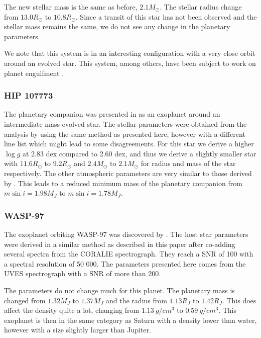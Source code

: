 \documentclass{aa}
\begin{document}
The new stellar mass is the same as before, $2.1M_\odot$. The stellar radius
change from $13.0R_\odot$ to $10.8R_\odot$. Since a transit of this star has not
been observed and the stellar mass remains the same, we do not see any change in
the planetary parameters.

We note that this system is in an interesting configuration with a very close
orbit around an evolved star. This system, among others, have been subject
to work on planet engulfment \citep[see e.g.][]{Kunitomo2011}.


\subsubsection{HIP 107773}
\label{sub:HIP_107773}
The planetary companion was presented in \citet{Jones2015} as an exoplanet
around an intermediate mass evolved star. The stellar parameters were obtained
from the analysis by \citet{Jones2011} using the same method as presented here,
however with a different line list which might lead to some disagreements. For
this star we derive a higher $\log g$ at 2.83 dex compared to 2.60 dex, and thus
we derive a slightly smaller star with $11.6R_\odot$ to $9.2R_\odot$ and
$2.4M_\odot$ to $2.1M_\odot$ for radius and mass of the star respectively. The
other atmospheric parameters are very similar to those derived by
\citet{Jones2011}. This leads to a reduced minimum mass of the planetary
companion from $m\sin i=1.98M_J$ to $m\sin i=1.78M_J$.



\subsubsection{WASP-97}
\label{sub:WASP-97}
The exoplanet orbiting WASP-97 was discovered by \citet{Hellier2014}. The host
star parameters were derived in a similar method as described in this paper
after co-adding several spectra from the CORALIE spectrograph. They reach a
SNR of 100 with a spectral resolution of 50 000. The parameters presented here
comes from the UVES spectrograph with a SNR of more than 200.

The parameters do not change much for this planet. The planetary mass is changed
from $1.32M_J$ to $1.37M_J$ and the radius from $1.13R_J$ to $1.42R_J$. This
does affect the density quite a lot, changing from $\SI{1.13}{g/cm^3}$ to
$\SI{0.59}{g/cm^3}$. This exoplanet is then in the same category as Saturn with
a density lower than water, however with a size slightly larger than Jupiter.
\end{document}
